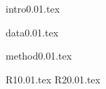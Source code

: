 \documentclass[useAMS,usenatbib]{mn2e}
\begin{document}
{intro0.01.tex}

{data0.01.tex}


{method0.01.tex}

{R10.01.tex}
{R20.01.tex}
\end{document}
